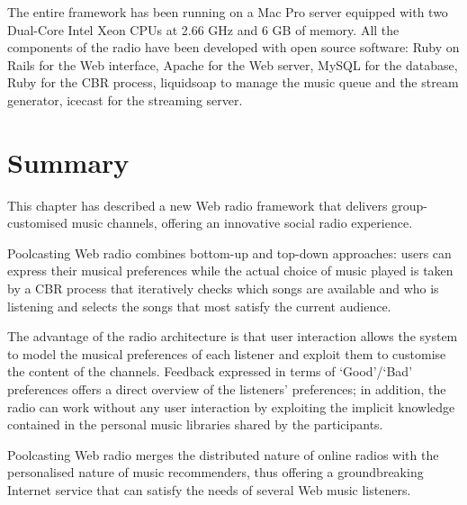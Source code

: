 The entire framework has been running on a Mac Pro server equipped with two Dual-Core Intel Xeon CPUs at 2.66 GHz and 6 GB of memory. %
%
All the components of the radio have been developed with open source software: \textsf{Ruby on Rails} for the Web interface, \textsf{Apache} for the Web server, \textsf{MySQL} for the database, \textsf{Ruby} for the CBR process, \textsf{liquidsoap} \cite{Baelde08} to manage the music queue and the stream generator, \textsf{icecast} for the streaming server.










\section{Summary} %
\label{sec:conclusions8}

This chapter has described a new Web radio framework that delivers group-customised music channels, offering an innovative social radio experience.

Poolcasting Web radio combines bottom-up and top-down approaches: users can express their musical preferences while the actual choice of music played is taken by a CBR process that iteratively checks which songs are available and who is listening and selects the songs that most satisfy the current audience.

The advantage of the radio architecture is that user interaction allows the system to model the musical preferences of each listener and exploit them to customise the content of the channels.
Feedback expressed in terms of `Good'/`Bad' preferences offers a direct overview of the listeners' preferences;
in addition, the radio can work without any user interaction by exploiting the implicit knowledge contained in the personal music libraries shared by the participants.

Poolcasting Web radio merges the distributed nature of online radios with the personalised nature of music recommenders, thus offering a groundbreaking Internet service that can satisfy the needs of several Web music listeners.



